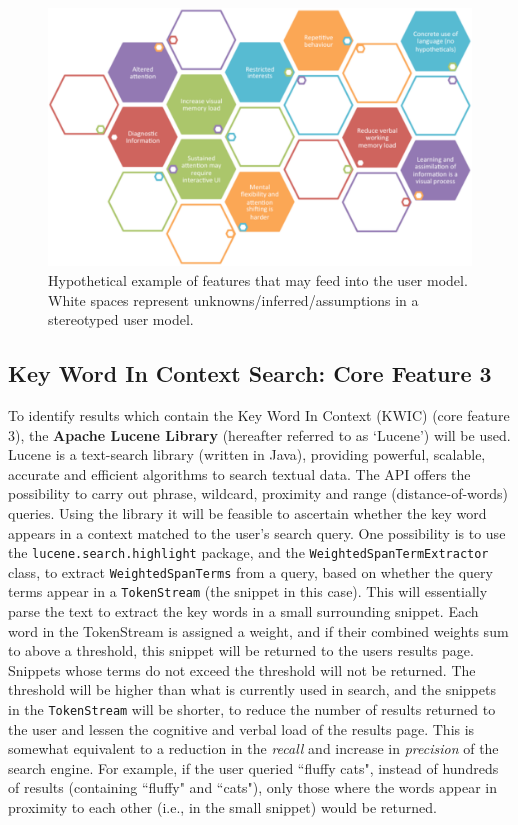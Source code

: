 \documentclass[a4paper, 11pt]{article}
\begin{document}
\begin{justify}
\begin{figure}[H]
\begin{center}
    \includegraphics[scale=0.65]{usermodelconstruct}
    \caption{Hypothetical example of features that may feed into the user model. White spaces represent unknowns/inferred/assumptions in a stereotyped user model.}
    \label{usermodelconstruct}
\end{center}
\end{figure}


\subsection{Key Word In Context Search: Core Feature 3}\label{apache}
To identify results which contain the Key Word In Context (KWIC)\cite{kwic} (core feature 3), the \textbf{Apache Lucene Library} (hereafter referred to as `Lucene') will be used. Lucene is a text-search library (written in Java), providing powerful, scalable, accurate and efficient algorithms to search textual data. The API offers the possibility to carry out phrase, wildcard, proximity and range (distance-of-words) queries. Using the library it will be feasible to ascertain whether the key word appears in a context matched to the user's search query. One possibility is to use the \texttt{lucene.search.highlight} package, and the \texttt{WeightedSpanTermExtractor} class, to extract \texttt{WeightedSpanTerms} from a query, based on whether the query terms appear in a \texttt{TokenStream} (the snippet in this case). This will essentially parse the text to extract the key words in a small surrounding snippet. Each word in the TokenStream is assigned a weight, and if their combined weights sum to above a threshold, this snippet will be returned to the users results page. Snippets whose terms do not exceed the threshold will not be returned. The threshold will be higher than what is currently used in search, and the snippets in the \texttt{TokenStream} will be shorter, to reduce the number of results returned to the user and lessen the cognitive and verbal load of the results page. This is somewhat equivalent to a reduction in the \textit{recall} and increase in \textit{precision} of the search engine. For example, if the user queried ``fluffy cats", instead of hundreds of results (containing ``fluffy" and ``cats"), only those where the words appear in proximity to each other (i.e., in the small snippet) would be returned. 


\end{justify}
\end{document}
